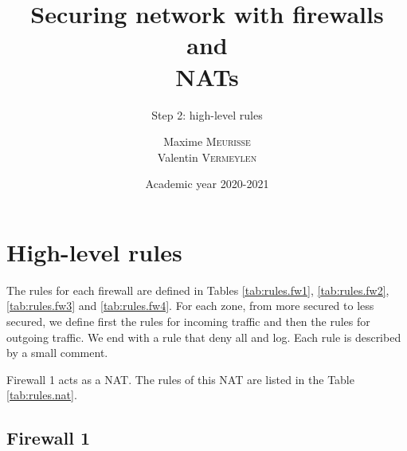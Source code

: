 \documentclass[a4paper, 12pt]{article}
\institute{University of Liège}
\title{Securing network with firewalls and\\NATs}
\subtitle{Step 2: high-level rules}
\author{Maxime \textsc{Meurisse}\\Valentin \textsc{Vermeylen}}
\date{Academic year 2020-2021}
\newcounter{idcounter}
\begin{document}
	\maketitle
	
	\section{High-level rules}
	
	The rules for each firewall are defined in Tables \ref{tab:rules.fw1}, \ref{tab:rules.fw2}, \ref{tab:rules.fw3} and \ref{tab:rules.fw4}. For each zone, from more secured to less secured, we define first the rules for incoming traffic and then the rules for outgoing traffic. We end with a rule that deny all and log. Each rule is described by a small comment.
	
	Firewall 1 acts as a NAT. The rules of this NAT are listed in the Table \ref{tab:rules.nat}.
	
	\subsection{Firewall 1}
	
	\setcounter{idcounter}{0}
	
\end{document}
